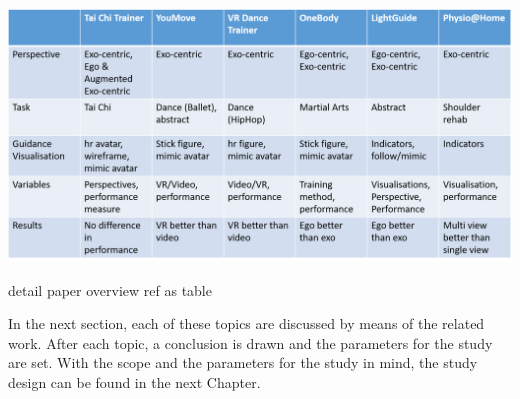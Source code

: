 \begin{table}
	\centering
	\includegraphics[width=1.0\textwidth]{img/detail_paper_overview.png}
	\caption{detail paper overview \todo ref as table}
	\label{tbl:detailOverviewTable}
\end{table}
In the next section, each of these topics are discussed by means of the related work. After each topic, a conclusion is drawn and the parameters for the study are set. With the scope and the parameters for the study in mind, the study design can be found in the next Chapter.


